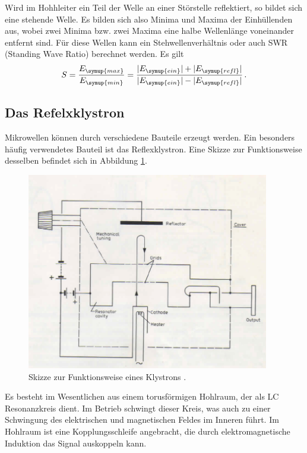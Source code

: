 Wird im Hohhleiter ein Teil der Welle an einer Störstelle reflektiert, so bildet
sich eine stehende Welle. Es bilden sich also Minima und Maxima der Einhüllenden
aus, wobei zwei Minima bzw. zwei Maxima eine halbe Wellenlänge voneinander entfernt
sind. Für diese Wellen kann ein Stehwellenverhältnis oder auch SWR (Standing Wave
Ratio) berechnet werden. Es gilt
\begin{equation}
  S=\frac{E_{\symup{max}}}{E_{\symup{min}}}=\frac{|E_{\symup{ein}}|+|E_{\symup{refl}}|}
  {|E_{\symup{ein}}|-|E_{\symup{refl}}|}\,.
\end{equation}


\subsection{Das Refelxklystron}
\label{subsec:klystron}
Mikrowellen können durch verschiedene Bauteile erzeugt werden. Ein besonders häufig
verwendetes Bauteil ist das Reflexklystron. Eine Skizze zur Funktionsweise desselben
befindet sich in Abbildung \ref{fig:klystron}.

\begin{figure}
  \centering
  \includegraphics[width=300pt]{data/klystron.png}
  \caption{Skizze zur Funktionsweise eines Klystrons \cite{Versuchsanleitung_alt}.}
  \label{fig:klystron}
\end{figure}

Es besteht im Wesentlichen aus einem torusförmigen Hohlraum, der als LC Resonanzkreis
dient. Im Betrieb schwingt dieser Kreis, was auch zu einer Schwingung des elektrischen
und magnetischen Feldes im Inneren führt. Im Hohlraum ist eine Kopplungsschleife
angebracht, die durch elektromagnetische Induktion das Signal auskoppeln kann.

